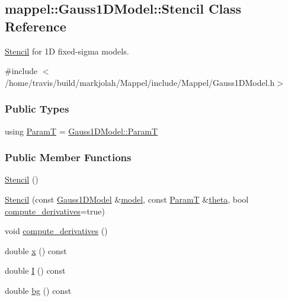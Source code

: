 \hypertarget{classmappel_1_1Gauss1DModel_1_1Stencil}{}\subsection{mappel\+:\+:Gauss1\+D\+Model\+:\+:Stencil Class Reference}
\label{classmappel_1_1Gauss1DModel_1_1Stencil}


\hyperlink{classmappel_1_1Gauss1DModel_1_1Stencil}{Stencil} for 1D fixed-\/sigma models.  




{\ttfamily \#include $<$/home/travis/build/markjolah/\+Mappel/include/\+Mappel/\+Gauss1\+D\+Model.\+h$>$}

\subsubsection*{Public Types}
\begin{DoxyCompactItemize}
\item 
using \hyperlink{classmappel_1_1Gauss1DModel_1_1Stencil_a861a81c7bbd677e31bf3ab20467a2adc}{ParamT} = \hyperlink{classmappel_1_1PointEmitterModel_a665ec6aea3aac139bb69a23c06d4b9a1}{Gauss1\+D\+Model\+::\+ParamT}
\end{DoxyCompactItemize}
\subsubsection*{Public Member Functions}
\begin{DoxyCompactItemize}
\item 
\hyperlink{classmappel_1_1Gauss1DModel_1_1Stencil_a66878efbd3a4d99940d963fbb7b144d1}{Stencil} ()
\item 
\hyperlink{classmappel_1_1Gauss1DModel_1_1Stencil_a6881e128436697dd57b41d20a1c8b56e}{Stencil} (const \hyperlink{classmappel_1_1Gauss1DModel}{Gauss1\+D\+Model} \&\hyperlink{classmappel_1_1Gauss1DModel_1_1Stencil_a22c7f0f7fd29ee1cc587f331ef186c76}{model}, const \hyperlink{classmappel_1_1Gauss1DModel_1_1Stencil_a861a81c7bbd677e31bf3ab20467a2adc}{ParamT} \&\hyperlink{classmappel_1_1Gauss1DModel_1_1Stencil_a2428fa45a83396cad7861fbeea44a86a}{theta}, bool \hyperlink{classmappel_1_1Gauss1DModel_1_1Stencil_a4bc1fdd7b3c4df021ac4a519c4e659f8}{compute\+\_\+derivatives}=true)
\item 
void \hyperlink{classmappel_1_1Gauss1DModel_1_1Stencil_a4bc1fdd7b3c4df021ac4a519c4e659f8}{compute\+\_\+derivatives} ()
\item 
double \hyperlink{classmappel_1_1Gauss1DModel_1_1Stencil_a07ab730c1e3945631c8899a5289fffba}{x} () const 
\item 
double \hyperlink{classmappel_1_1Gauss1DModel_1_1Stencil_a2c254393720d2b7d499b8e93390e5580}{I} () const 
\item 
double \hyperlink{classmappel_1_1Gauss1DModel_1_1Stencil_a402ee3f3b26f9190a866acbe567e3ebf}{bg} () const 
\end{DoxyCompactItemize}
